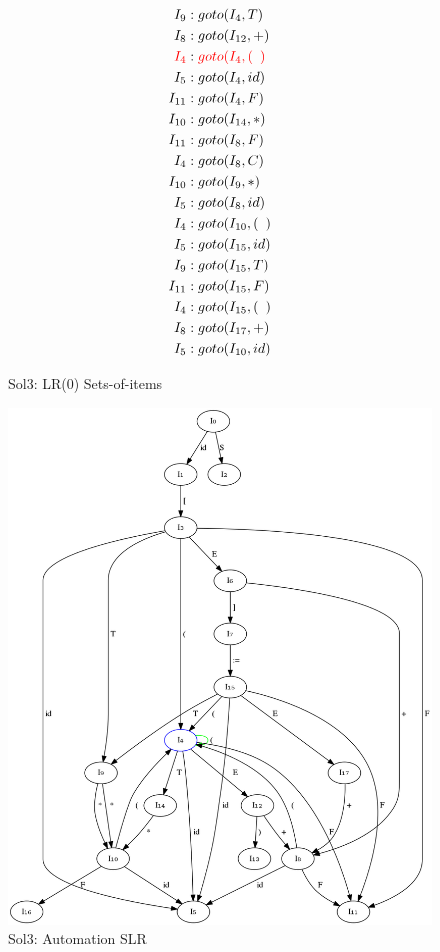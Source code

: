 \documentclass{article}
\newcommand\tab[1][5pt]{\hspace*{#1}}
\begin{document}
\begin{figure}[h!]
\begin{multicols}{2}
\begin{equation*}
\begin{aligned}
I_{9} &: goto(I_4,T) \\
I_8 &: goto(I_{12},+) \\
\color{red} {I_4} &: \color{red} {goto(I_{4},( \tab )} \\
I_5 &: goto(I_{4},id) \\
I_{11} &: goto(I_{4},F) \\
I_{10} &: goto(I_{14},*) \\
I_{11} &: goto(I_{8},F) \\ 
I_{4} &: goto(I_{8},C) \\
I_{10} &: goto(I_{9},*) \\
I_{5} &: goto(I_{8},id) \\
I_{4} &: goto(I_{10},( \tab ) \\
I_{5} &: goto(I_{15},id) \\
I_{9} &: goto(I_{15},T) \\
I_{11} &: goto(I_{15},F) \\
I_{4} &: goto(I_{15},( \tab ) \\
I_{8} &: goto(I_{17},+) \\
I_{5} &: goto(I_{10},id) \\
\end{aligned}
\end{equation*}
\end{multicols}
\caption{Sol3: LR(0) Sets-of-items }
\label{soi3}
\end{figure}

\begin{figure}[h!]
\begin{center}
\includegraphics[scale=0.5]{autoSLR.png}
\caption{Sol3: Automation SLR }
\label{auto3}
\end{center}
\end{figure}
\end{document}
